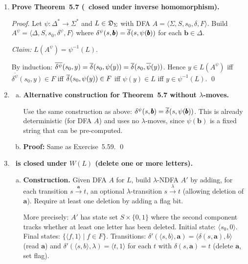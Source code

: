 \begin{enumerate}[{5.}1. ]
\item \textbf{Prove Theorem~5.7 (\DSIG\ closed under inverse homomorphism).}

\begin{proof}
Let $\psi:\Delta^*\to\Sigma^*$ and $L\in\mathfrak{D}_\Sigma$ with DFA $A=\langle\Sigma,S,s_0,\delta,F\rangle$.
Build $A^\psi=\langle\Delta,S,s_0,\delta^\psi,F\rangle$ where
$\delta^\psi(s,\pmb{b})=\overline{\delta^{}}(s,\psi(\pmb{b}))$ for each $\pmb{b}\in\Delta$.

\emph{Claim:} $L(A^\psi)=\psi^{-1}(L)$.

By induction: $\overline{\delta^\psi}(s_0,y)=\overline{\delta^{}}(s_0,\psi(y))=\overline{\delta^{}}(s_0,\overline{\psi}(y))$.
Hence $y\in L(A^\psi)$ iff $\overline{\delta^\psi}(s_0,y)\in F$ iff $\overline{\delta^{}}(s_0,\psi(y))\in F$ iff $\psi(y)\in L$ iff $y\in\psi^{-1}(L)$. \qed
\end{proof}

\item \begin{enumerate}[(a)]
  \item \textbf{Alternative construction for Theorem~5.7 without $\lambda$-moves.}

  Use the same construction as above: $\delta^\psi(s,\pmb{b})=\overline{\delta^{}}(s,\psi(\pmb{b}))$.  This is already deterministic (for DFA $A$) and uses no $\lambda$-moves, since $\psi(\pmb{b})$ is a fixed string that can be pre-computed.

  \item \textbf{Proof:}  Same as Exercise~5.59. \qed
\end{enumerate}

\item \textbf{\DSIG\ is closed under $W(L)$ (delete one or more letters).}

\begin{enumerate}[(a)]
  \item \textbf{Construction.}  Given DFA $A$ for $L$, build $\lambda$-NDFA $A'$ by adding, for each transition $s\xrightarrow{\pmb{a}}t$, an optional $\lambda$-transition $s\xrightarrow{\lambda}t$ (allowing deletion of $\pmb{a}$).  Require at least one deletion by adding a flag bit.

  More precisely: $A'$ has state set $S\times\{0,1\}$ where the second component tracks whether at least one letter has been deleted.  Initial state: $\langle s_0,0\rangle$.  Final states: $\{\langle f,1\rangle\mid f\in F\}$.  Transitions: $\delta'(\langle s,b\rangle,\pmb{a})=\langle\delta(s,\pmb{a}),b\rangle$ (read $\pmb{a}$) and $\delta'(\langle s,b\rangle,\lambda)=\langle t,1\rangle$ for each $t$ with $\delta(s,\pmb{a})=t$ (delete $\pmb{a}$, set flag).


\end{enumerate}
\end{enumerate}
